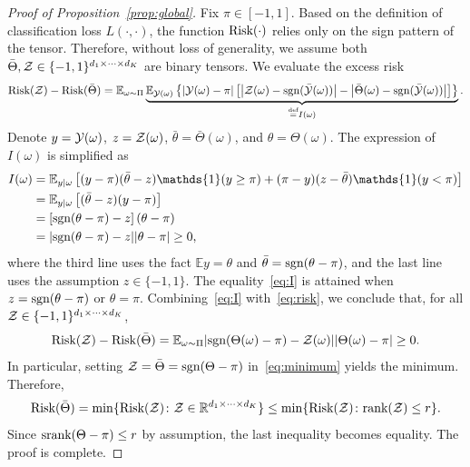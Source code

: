 \documentclass[11pt]{article}
\theoremstyle{plain}
\theoremstyle{definition}
\newcommand*{\KeepStyleUnderBrace}[1]{%
  \mathop{%
    \mathchoice
    {\underbrace{\displaystyle#1}}%
    {\underbrace{\textstyle#1}}%
    {\underbrace{\scriptstyle#1}}%
    {\underbrace{\scriptscriptstyle#1}}%
  }\limits
}
\def\sign{\textup{sgn}}
\def\srank{\textup{srank}}
\def\rank{\textup{rank}}
\def\risk{\textup{Risk}}
\begin{document}
\begin{proof}[Proof of Proposition~\ref{prop:global}]
Fix $\pi\in[-1,1]$. Based on the definition of classification loss $L(\cdot,\cdot)$, the function $\risk(\cdot)$ relies only on the sign pattern of the tensor. Therefore, without loss of generality, we assume both $\bar \Theta, \mathcal{Z} \in\{-1,1\}^{d_1\times \cdots \times d_K}$ are binary tensors. 
We evaluate the excess risk 
\begin{equation}\label{eq:risk}
\risk(\tZ)- \risk(\bar \Theta) = \mathbb{E}_{\omega\sim \Pi}\KeepStyleUnderBrace{\mathbb{E}_{\tY(\omega)}\left\{|\tY(\omega)-\pi|\left[\left|\tZ(\omega)-\sign(\bar \tY(\omega)) \right|-\left|\bar\Theta(\omega)-\sign(\bar \tY(\omega))\right|\right]\right\}}_{\stackrel{\text{def}}{=}I(\omega)}.
\end{equation}
Denote $y=\mathcal{Y}(\omega)$, $z=\mathcal{Z}(\omega)$, $\bar \theta=\bar\Theta(\omega)$, and $\theta=\Theta(\omega)$. The expression of $I(\omega)$ is simplified as
\begin{align}\label{eq:I}
I(\omega)&= \mathbb{E}_{y|\omega}\left[ (y-\pi)(\bar \theta-z)\mathds{1}(y\geq \pi)+(\pi-y)(z-\bar \theta)\mathds{1}(y< \pi)\right]\notag \\
&= \mathbb{E}_{y|\omega}\left[(\bar \theta-z) (y-\pi)\right]\notag \\
&=  \left[\sign(\theta-\pi)-z\right]\left(\theta-\pi\right)\notag \\
&= |\sign(\theta-\pi)-z||\theta-\pi|\geq 0,
\end{align}
where the third line uses the fact $\mathbb{E}y=\theta$ and $\bar \theta=\sign(\theta-\pi)$, and the last line uses the assumption $z \in\{-1,1\}$. The equality~\eqref{eq:I} is attained when $z=\sign(\theta-\pi)$ or $\theta=\pi$. Combining~\eqref{eq:I} with~\eqref{eq:risk}, we conclude that, for all $\mathcal{Z}\in\{-1,1\}^{d_1\times \cdots \times d_K}$, 
\begin{equation}\label{eq:minimum}
\risk(\tZ)- \risk(\bar \Theta) = \mathbb{E}_{\omega\sim \Pi} |\sign(\Theta(\omega)-\pi)-\tZ(\omega)||\Theta(\omega)-\pi|\geq 0.
\end{equation}
In particular, setting $\tZ=\bar \Theta=\sign(\Theta-\pi)$ in~\eqref{eq:minimum} yields the minimum. Therefore, 
\[
\risk(\bar \Theta)=\min\{\risk(\tZ)\colon \tZ\in \mathbb{R}^{d_1\times \cdots \times d_K}\} \leq \min\{\risk(\tZ)\colon \rank(\tZ)\leq r\}.
\]
Since $\srank(\Theta-\pi)\leq r$ by assumption, the last inequality becomes equality. The proof is complete. 
\end{proof}
\end{document}

